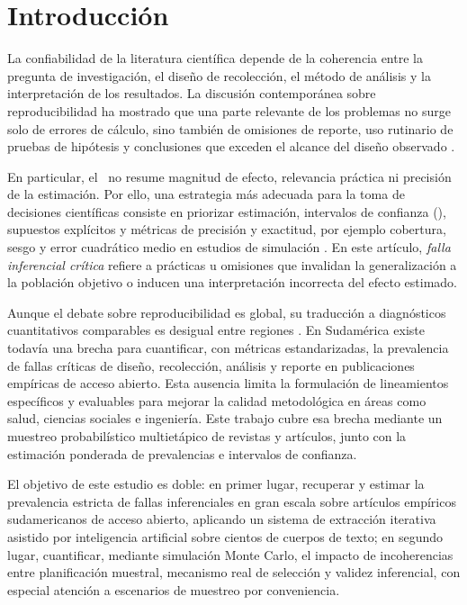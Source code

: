 \section{Introducción}
\label{sec:introduccion}

La confiabilidad de la literatura científica depende de la coherencia entre la pregunta de investigación, el diseño de recolección, el método de análisis y la interpretación de los resultados. La discusión contemporánea sobre reproducibilidad ha mostrado que una parte relevante de los problemas no surge solo de errores de cálculo, sino también de omisiones de reporte, uso rutinario de pruebas de hipótesis y conclusiones que exceden el alcance del diseño observado \citep{ioannidis2005,osc2015,schmidt2025}.

En particular, el \pvalue\ no resume magnitud de efecto, relevancia práctica ni precisión de la estimación. Por ello, una estrategia más adecuada para la toma de decisiones científicas consiste en priorizar estimación, intervalos de confianza (\IC), supuestos explícitos y métricas de precisión y exactitud, por ejemplo cobertura, sesgo y error cuadrático medio en estudios de simulación \citep{farcomeni2017,mansournia2021,darrigo2024}. En este artículo, \textit{falla inferencial crítica} refiere a prácticas u omisiones que invalidan la generalización a la población objetivo o inducen una interpretación incorrecta del efecto estimado.

Aunque el debate sobre reproducibilidad es global, su traducción a diagnósticos cuantitativos comparables es desigual entre regiones \citep{beigel2024}. En Sudamérica existe todavía una brecha para cuantificar, con métricas estandarizadas, la prevalencia de fallas críticas de diseño, recolección, análisis y reporte en publicaciones empíricas de acceso abierto. Esta ausencia limita la formulación de lineamientos específicos y evaluables para mejorar la calidad metodológica en áreas como salud, ciencias sociales e ingeniería. Este trabajo cubre esa brecha mediante un muestreo probabilístico multietápico de revistas y artículos, junto con la estimación ponderada de prevalencias e intervalos de confianza.

El objetivo de este estudio es doble: en primer lugar, recuperar y estimar la prevalencia estricta de fallas inferenciales en gran escala sobre artículos empíricos sudamericanos de acceso abierto, aplicando un sistema de extracción iterativa asistido por inteligencia artificial sobre cientos de cuerpos de texto; en segundo lugar, cuantificar, mediante simulación Monte Carlo, el impacto de incoherencias entre planificación muestral, mecanismo real de selección y validez inferencial, con especial atención a escenarios de muestreo por conveniencia.

